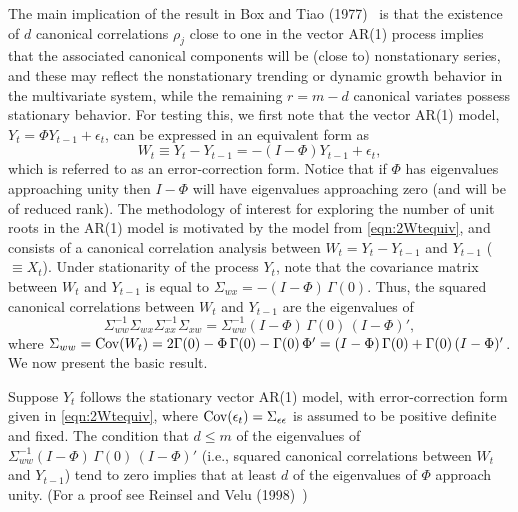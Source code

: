 The main implication of the result in Box and Tiao (1977)~\cite{box77} is that the existence of $d$ canonical correlations $\rho_j$ close to one in the vector AR(1) process implies that the associated canonical components will be (close to) nonstationary series, and these may reflect the nonstationary trending or dynamic growth behavior in the multivariate system, while the remaining $r= m - d$ canonical variates possess stationary behavior. For testing this, we first note that the vector AR(1) model, $Y_t = \Phi Y_{t-1} + \epsilon_t$, can be expressed in an equivalent form as
	\begin{equation} \label{eqn:2Wtequiv}
	W_t \equiv Y_t - Y_{t-1} = - (I - \Phi ) Y_{t-1} + \epsilon_t, 
	\end{equation}
which is referred to as an error-correction form.  Notice that if $\Phi$ has eigenvalues approaching unity then $I - \Phi$ will have eigenvalues approaching zero (and will be of reduced rank).  The methodology of interest for exploring the number of unit roots in the AR(1) model is motivated by the model from \eqref{eqn:2Wtequiv}, and consists of a canonical correlation analysis between $W_t = Y_t - Y_{t-1}$ and $Y_{t-1}$ ($\equiv X_t$).  Under stationarity of the process $Y_t$, note that the covariance matrix between $W_t$ and $Y_{t-1}$ is equal to $\Sigma_{wx} = - (I - \Phi )\, \Gamma(0)$.  Thus, the squared canonical correlations between $W_t$ and $Y_{t-1}$ are the eigenvalues of
	\begin{equation} \label{eqn:2doublesigma}
	\Sigma_{ww}^{-1} \Sigma_{wx} \Sigma_{xx}^{-1} \Sigma_{xw}= \Sigma_{ww}^{-1} ( I - \Phi )\, \Gamma(0) \,(I  - \Phi )', 
	\end{equation}
where $\Sigma_{ww} = \operatorname{Cov}(W_t) = 2 \Gamma(0) - \Phi\, \Gamma (0) - \Gamma(0)\, \Phi' = (I - \Phi )\, \Gamma (0) + \Gamma(0) \,( I - \Phi)'$. We now present the basic result.


\begin{result} \label{res:7}
Suppose $Y_t$ follows the stationary vector AR(1) model, with error-correction form given in \eqref{eqn:2Wtequiv}, where $\operatorname{Cov}(\epsilon_t) = \Sigma_{\epsilon\epsilon}$ is assumed to be positive definite and fixed. The condition that $d \leq m$ of the eigenvalues of $\Sigma_{ww}^{-1} (I - \Phi )\, \Gamma (0) \,(I- \Phi )' $ (i.e., squared canonical correlations between $W_t$ and $Y_{t-1}$) tend to zero implies that at least $d$ of the eigenvalues of $\Phi$ approach unity. (For a proof see Reinsel and Velu (1998)~\cite[p. 138--139]{velurein})
\end{result}


